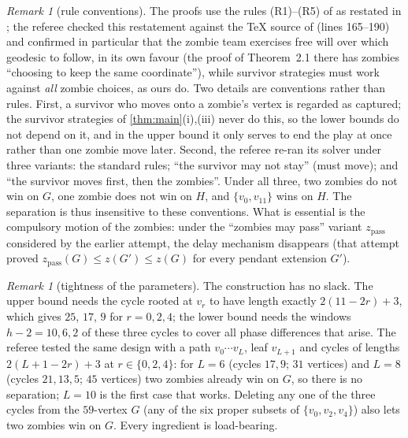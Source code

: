 \documentclass[11pt,a4paper]{article}
\theoremstyle{plain}
\theoremstyle{definition}
\theoremstyle{remark}
\newtheorem{remark}[theorem]{Remark}
\begin{document}
\begin{remark}[rule conventions]\label{rem:conventions}
The proofs use the rules (R1)--(R5) of \cite{FHMP16} as restated in \cite{BBBLN21}; the referee checked this restatement against the TeX source of \cite{BBBLN21} (lines 165--190) and confirmed in particular that the zombie team exercises free will over which geodesic to follow, in its own favour (the proof of Theorem~2.1 there has zombies ``choosing to keep the same coordinate''), while survivor strategies must work against \emph{all} zombie choices, as ours do. Two details are conventions rather than rules. First, a survivor who moves onto a zombie's vertex is regarded as captured; the survivor strategies of \cref{thm:main}(i),(iii) never do this, so the lower bounds do not depend on it, and in the upper bound it only serves to end the play at once rather than one zombie move later. Second, the referee re-ran its solver under three variants: the standard rules; ``the survivor may not stay'' (must move); and ``the survivor moves first, then the zombies''. Under all three, two zombies do not win on $G$, one zombie does not win on $H$, and $\{v_0,v_{11}\}$ wins on $H$. The separation is thus insensitive to these conventions. What is essential is the compulsory motion of the zombies: under the ``zombies may pass'' variant $z_{\mathrm{pass}}$ considered by the earlier attempt, the delay mechanism disappears (that attempt proved $z_{\mathrm{pass}}(G)\le z(G')\le z(G)$ for every pendant extension $G'$).
\end{remark}

\begin{remark}[tightness of the parameters]\label{rem:tight}
The construction has no slack. The upper bound needs the cycle rooted at $v_r$ to have length exactly $2(11-2r)+3$, which gives $25$, $17$, $9$ for $r=0,2,4$; the lower bound needs the windows $h-2=10,6,2$ of these three cycles to cover all phase differences that arise. The referee tested the same design with a path $v_0\cdots v_L$, leaf $v_{L+1}$ and cycles of lengths $2(L+1-2r)+3$ at $r\in\{0,2,4\}$: for $L=6$ (cycles $17,9$; $31$ vertices) and $L=8$ (cycles $21,13,5$; $45$ vertices) two zombies already win on $G$, so there is no separation; $L=10$ is the first case that works. Deleting any one of the three cycles from the $59$-vertex $G$ (any of the six proper subsets of $\{v_0,v_2,v_4\}$) also lets two zombies win on $G$. Every ingredient is load-bearing.
\end{remark}
\end{document}
